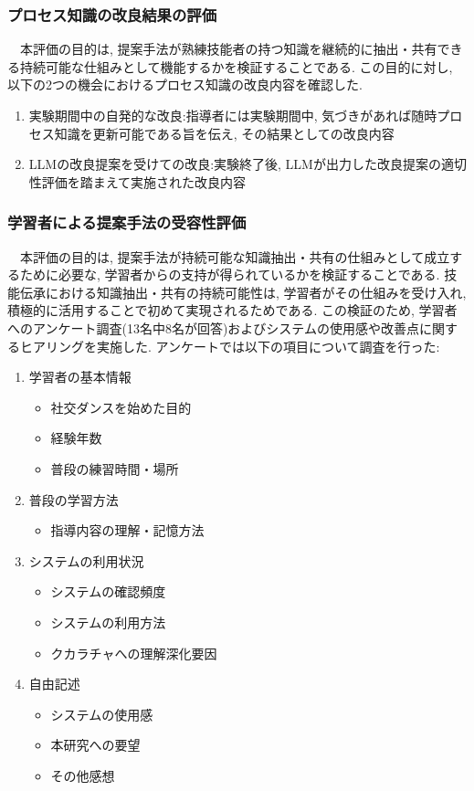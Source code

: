 \subsubsection{プロセス知識の改良結果の評価}
　本評価の目的は, 提案手法が熟練技能者の持つ知識を継続的に抽出・共有できる持続可能な仕組みとして機能するかを検証することである. この目的に対し, 以下の2つの機会におけるプロセス知識の改良内容を確認した.\\
\begin{enumerate}
\item 実験期間中の自発的な改良:指導者には実験期間中, 気づきがあれば随時プロセス知識を更新可能である旨を伝え, その結果としての改良内容
\item LLMの改良提案を受けての改良:実験終了後, LLMが出力した改良提案の適切性評価を踏まえて実施された改良内容
\end{enumerate}

\subsubsection{学習者による提案手法の受容性評価}
　本評価の目的は, 提案手法が持続可能な知識抽出・共有の仕組みとして成立するために必要な, 学習者からの支持が得られているかを検証することである. 技能伝承における知識抽出・共有の持続可能性は, 学習者がその仕組みを受け入れ, 積極的に活用することで初めて実現されるためである. この検証のため, 学習者へのアンケート調査(13名中8名が回答)およびシステムの使用感や改善点に関するヒアリングを実施した. アンケートでは以下の項目について調査を行った:\\
\begin{enumerate}
\item 学習者の基本情報
    \begin{itemize}
        \item 社交ダンスを始めた目的
        \item 経験年数
        \item 普段の練習時間・場所
    \end{itemize}
\item 普段の学習方法
    \begin{itemize}
        \item 指導内容の理解・記憶方法
    \end{itemize}
\item システムの利用状況
    \begin{itemize}
        \item システムの確認頻度
        \item システムの利用方法
        \item クカラチャへの理解深化要因
    \end{itemize}
\item 自由記述
    \begin{itemize}
        \item システムの使用感
        \item 本研究への要望
        \item その他感想
    \end{itemize}
\end{enumerate}


